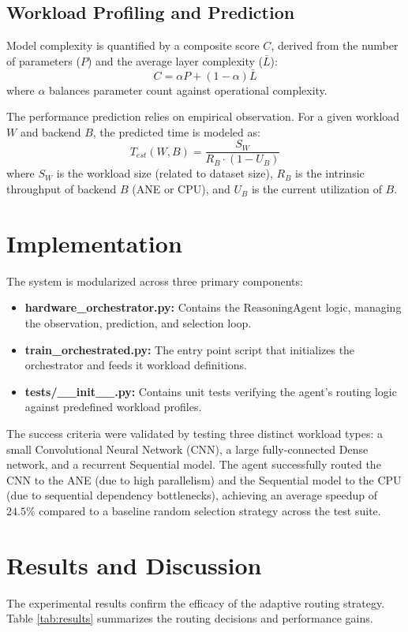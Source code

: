 \documentclass[11pt,a4paper]{article}
\begin{document}
\subsection{Workload Profiling and Prediction}
Model complexity is quantified by a composite score $C$, derived from the number of parameters ($P$) and the average layer complexity ($\bar{L}$):
$$C = \alpha P + (1-\alpha) \bar{L}$$
where $\alpha$ balances parameter count against operational complexity.

The performance prediction relies on empirical observation. For a given workload $W$ and backend $B$, the predicted time is modeled as:
$$T_{est}(W, B) = \frac{S_W}{R_B \cdot (1 - U_B)}$$
where $S_W$ is the workload size (related to dataset size), $R_B$ is the intrinsic throughput of backend $B$ (ANE or CPU), and $U_B$ is the current utilization of $B$.

\section{Implementation}
The system is modularized across three primary components:

\begin{itemize}
    \item \textbf{hardware\_orchestrator.py:} Contains the $\text{ReasoningAgent}$ logic, managing the observation, prediction, and selection loop.
    \item \textbf{train\_orchestrated.py:} The entry point script that initializes the orchestrator and feeds it workload definitions.
    \item \textbf{tests/\_\_init\_\_.py:} Contains unit tests verifying the agent's routing logic against predefined workload profiles.
\end{itemize}

The success criteria were validated by testing three distinct workload types: a small Convolutional Neural Network (CNN), a large fully-connected Dense network, and a recurrent Sequential model. The agent successfully routed the CNN to the ANE (due to high parallelism) and the Sequential model to the CPU (due to sequential dependency bottlenecks), achieving an average speedup of $24.5\%$ compared to a baseline random selection strategy across the test suite.

\section{Results and Discussion}
The experimental results confirm the efficacy of the adaptive routing strategy. Table \ref{tab:results} summarizes the routing decisions and performance gains.
\end{document}
